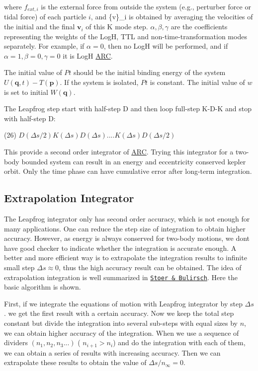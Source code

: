 where $ f_{ext,i} $ is the external force from outside the system (e.\+g., perturber force or tidal force) of each particle $ i$, and  \{v\}\+\_\+i  is obtained by averaging the velocities of the initial and the final $ \mathbf{v}_i $ of this K mode step. $ \alpha, \beta, \gamma $ are the coefficients representing the weights of the LogH, T\+TL and non-\/time-\/transformation modes separately. For example, if $ \alpha=0$, then no LogH will be performed, and if $ \alpha =1, \beta=0, \gamma=0 $ it is LogH \hyperlink{namespaceARC}{A\+RC}.

The initial value of $ Pt $ should be the initial binding energy of the system $ U(\mathbf{q},t) - T(\mathbf{p}) $. If the system is isolated, $ Pt $ is constant. The initial value of $ w$ is set to initial $ W(\mathbf{q}) $.

The Leapfrog step start with half-\/step D and then loop full-\/step K-\/\+D-\/K and stop with half-\/step D\+:

(26) $ D(\Delta s/2)K(\Delta s)D(\Delta s)....K(\Delta s)D(\Delta s/2) $

This provide a second order integrator of \hyperlink{namespaceARC}{A\+RC}. Trying this integrator for a two-\/body bounded system can result in an energy and eccentricity conserved kepler orbit. Only the time phase can have cumulative error after long-\/term integration.\hypertarget{index_extrapolation_sec}{}\subsection{Extrapolation Integrator}\label{index_extrapolation_sec}
The Leapfrog integrator only has second order accuracy, which is not enough for many applications. One can reduce the step size of integration to obtain higher accuracy. However, as energy is always conserved for two-\/body motions, we don\textquotesingle{}t have good checker to indicate whether the integration is accurate enough. A better and more efficient way is to extrapolate the integration results to infinite small step $ \Delta s\approx 0$, thus the high accuracy result can be obtained. The idea of extrapolation integration is well summarized in \href{http://link.springer.com/book/10.1007%2F978-0-387-21738-3}{\tt Stoer \& Bulirsch}. Here the basic algorithm is shown.

First, if we integrate the equations of motion with Leapfrog integrator by step $ \Delta s$. we get the first result with a certain accuracy. Now we keep the total step constant but divide the integration into several sub-\/steps with equal sizes by $ n $, we can obtain higher accuracy of the integration. When we use a sequence of dividers $ (n_1, n_2, n_3 ...)$ ( $ n_{i+1}>n_i$) and do the integration with each of them, we can obtain a series of results with increasing accuracy. Then we can extrapolate these results to obtain the value of $ \Delta s/n_{\infty}=0 $.

